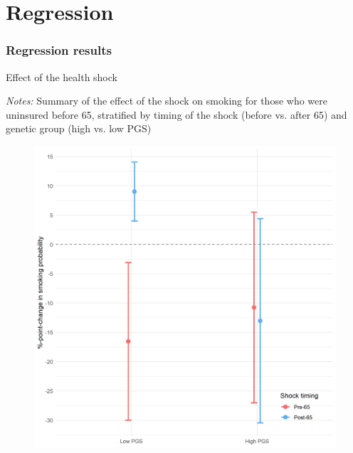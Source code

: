 \documentclass[10pt,compress,xcolor=dvipsnames]{beamer}    %
\newcounter{ex}
\newcommand{\1}[1]{\mathrm{1\hspace*{-2.5pt}l}[#1]}	%
\begin{document}
\section{Regression}
\begin{frame}
\frametitle{Regression results}

\hspace{-5ex}
\begin{minipage}{.49\textwidth}
	\begin{table}[ht]
		\caption{Effect of the health shock} %
		\small\resizebox{0.65\textheight}{!}{
		
		}

		\vspace{1ex}

		{\raggedright \tiny \textit{Notes:} Summary of the effect of the shock on smoking for those who were uninsured before 65, stratified by timing of the shock (before vs. after 65) and genetic group (high vs. low PGS) \par}
	\end{table}
\end{minipage}
%
\hspace{4ex}
%
\begin{minipage}{.49\textwidth}
	\vspace{5ex}
	\begin{figure}[hbtp]
	\centering
	\includegraphics[height=0.65\textheight]{../../3_output/shock_effects/main_6070_100_cvplot.png}
	\label{fig:maincoeffplot}
	\end{figure}
	\hyperlink{frame:reg}{}
	\hyperlink{frame:fullreg}{}
\end{minipage}

\end{frame}
\end{document}
